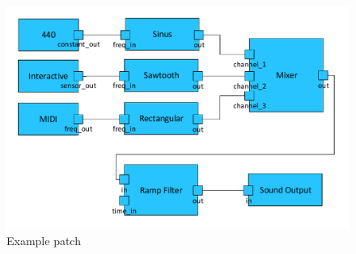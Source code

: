 %
%
%
%
%
%
	\begin{figure}[!h]
		\centering
			\includegraphics[width=\textwidth]{images/ex_patch.pdf}
		\caption{Example patch}
		\label{fig:ex_patch}
	\end{figure}

